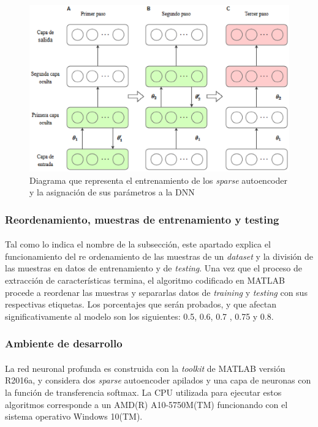 \documentclass[12pt]{article}%
\begin{document}
\begin{figure}[ht]
  \centering
    \includegraphics[scale=0.9]{./training.eps}
  \caption{Diagrama que representa el entrenamiento de los \textit{sparse} autoencoder y la asignación de sus parámetros a la DNN}
  \label{fig:deepnet}
\end{figure}

\subsubsection{Reordenamiento, muestras de entrenamiento y testing}
\paragraph{}
Tal como lo indica el nombre de la subsección, este apartado explica el funcionamiento del re ordenamiento de las muestras de un \textit{dataset} y la división de las muestras en datos de entrenamiento y de \textit{testing}. Una vez que el proceso de extracción de características termina, el algoritmo codificado en MATLAB procede a reordenar las muestras y separarlas datos de \textit{training} y \textit{testing} con sus respectivas etiquetas. Los porcentajes que serán probados, y que afectan significativamente al modelo son los siguientes: 0.5, 0.6, 0.7 , 0.75 y 0.8.

\subsubsection{Ambiente de desarrollo}
\paragraph{}
La red neuronal profunda es construida con la \textit{toolkit} de MATLAB versión R2016a, y considera dos \textit{sparse} autoencoder apilados y una capa de neuronas con la función de transferencia softmax. La CPU utilizada para ejecutar estos algoritmos corresponde a un AMD(R) A10-5750M(TM) funcionando con el sistema operativo Windows 10(TM). 
\end{document}
